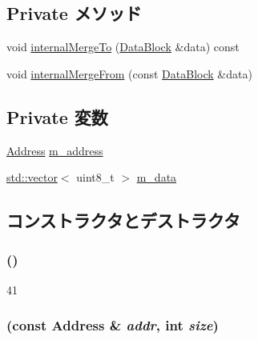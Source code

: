 \subsection*{Private メソッド}
\begin{DoxyCompactItemize}
\item 
void \hyperlink{classSubBlock_a1bb051cbcd8313199cf9cc0b9a2bd3d9}{internalMergeTo} (\hyperlink{classDataBlock}{DataBlock} \&data) const 
\item 
void \hyperlink{classSubBlock_a981c16d3eee49c8ea8ef91c0ea405558}{internalMergeFrom} (const \hyperlink{classDataBlock}{DataBlock} \&data)
\end{DoxyCompactItemize}
\subsection*{Private 変数}
\begin{DoxyCompactItemize}
\item 
\hyperlink{classAddress}{Address} \hyperlink{classSubBlock_a9fc76d7db60d4f05200f8248a697ea28}{m\_\-address}
\item 
\hyperlink{classstd_1_1vector}{std::vector}$<$ uint8\_\-t $>$ \hyperlink{classSubBlock_a84a8da60d3838968e643ef3e2f04ba7f}{m\_\-data}
\end{DoxyCompactItemize}


\subsection{コンストラクタとデストラクタ}
\hypertarget{classSubBlock_ae185d3db5809c94218aeb10e88f4d549}{
\subsubsection[{SubBlock}]{ ()}}
\label{classSubBlock_ae185d3db5809c94218aeb10e88f4d549}



\begin{DoxyCode}
41 { }
\end{DoxyCode}
\hypertarget{classSubBlock_a51e22821bb29b1f6c680af41d805f562}{
\subsubsection[{SubBlock}]{ (const {\bf Address} \& {\em addr}, \/  int {\em size})}}
\label{classSubBlock_a51e22821bb29b1f6c680af41d805f562}



